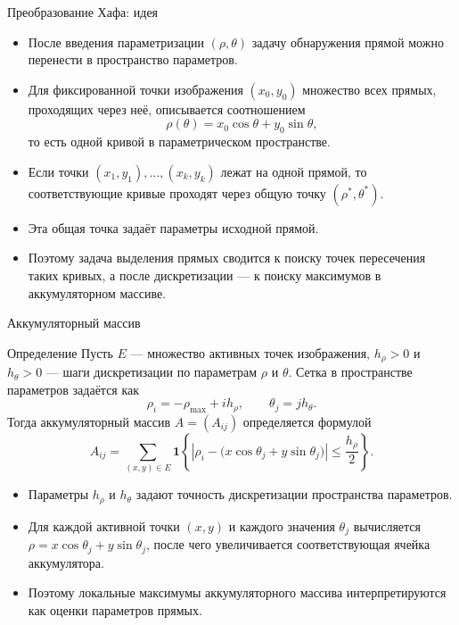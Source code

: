 \documentclass[unicode,notheorems]{beamer}
\begin{document}
\begin{frame}{Преобразование Хафа: идея}
	\begin{itemize}
		\item После введения параметризации $(\rho,\theta)$ задачу обнаружения прямой можно перенести в пространство параметров.
		\item Для фиксированной точки изображения $(x_0,y_0)$ множество всех прямых, проходящих через неё, описывается соотношением
		\[
		\rho(\theta) = x_0 \cos \theta + y_0 \sin \theta,
		\]
		то есть одной кривой в параметрическом пространстве.
		\item Если точки $(x_1,y_1),\dots,(x_k,y_k)$ лежат на одной прямой, то соответствующие кривые проходят через общую точку $(\rho^\ast,\theta^\ast)$.
		\item Эта общая точка задаёт параметры исходной прямой.
		\item Поэтому задача выделения прямых сводится к поиску точек пересечения таких кривых, а после дискретизации --- к поиску максимумов в аккумуляторном массиве.
	\end{itemize}
\end{frame}

\begin{frame}{Аккумуляторный массив}
	\small
	\begin{block}{Определение}
		{\scriptsize
		Пусть $E$ --- множество активных точек изображения,
		$h_\rho>0$ и $h_\theta>0$ --- шаги дискретизации по параметрам $\rho$ и $\theta$.
		Сетка в пространстве параметров задаётся как
		\[
		\rho_i = -\rho_{\max} + i h_\rho,\qquad
		\theta_j = j h_\theta.
		\]
		Тогда аккумуляторный массив $A=(A_{ij})$ определяется формулой
		\[
		A_{ij} =
		\sum_{(x,y)\in E}
		\mathbf{1}\left\{
		\left| \rho_i - \bigl(x\cos\theta_j + y\sin\theta_j\bigr) \right|
		\le \frac{h_\rho}{2}
		\right\}.
		\]
		}
	\end{block}

	\begin{itemize}
		\item Параметры $h_\rho$ и $h_\theta$ задают точность дискретизации пространства параметров.
		\item Для каждой активной точки $(x,y)$ и каждого значения $\theta_j$ вычисляется $\rho = x\cos\theta_j + y\sin\theta_j$, после чего увеличивается соответствующая ячейка аккумулятора.
		\item Поэтому локальные максимумы аккумуляторного массива интерпретируются как оценки параметров прямых.
	\end{itemize}
\end{frame}
\end{document}
